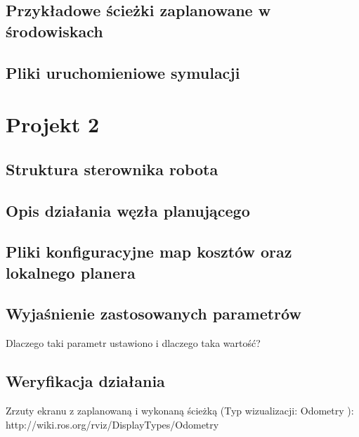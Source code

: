 \documentclass{mwrep}
\begin{document}
\section{Przykładowe ścieżki zaplanowane w środowiskach}

\section{Pliki uruchomieniowe symulacji}


\chapter{Projekt 2}

\section{Struktura sterownika robota}

\section{Opis działania węzła planującego}

\section{Pliki konfiguracyjne map kosztów oraz lokalnego planera}

\section{Wyjaśnienie zastosowanych parametrów}
Dlaczego taki parametr ustawiono i dlaczego taka wartość?
\section{Weryfikacja działania}
Zrzuty ekranu z zaplanowaną i wykonaną ścieżką (Typ
wizualizacji: Odometry ): http://wiki.ros.org/rviz/DisplayTypes/Odometry
\end{document}
